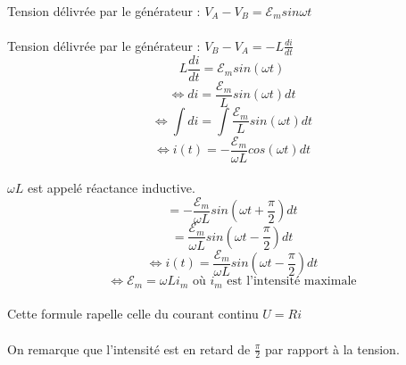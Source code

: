 \documentclass[a4paper]{article}
\begin{document}
\paragraph{} Tension délivrée par le générateur : $V_A-V_B=\mathscr{E}_msin{\omega t}$
\paragraph{} Tension délivrée par le générateur : $V_B-V_A=-L\frac{di}{dt}$
\[L\frac{di}{dt}=\mathscr{E}_msin(\omega t)\]
\[\Leftrightarrow di=\frac{\mathscr{E}_m}{L}sin(\omega t)dt\]
\[\Leftrightarrow \int di=\int \frac{\mathscr{E}_m}{L}sin(\omega t)dt\]
\[\Leftrightarrow i(t)=-\frac{\mathscr{E}_m}{\omega L}cos(\omega t)dt\]
\paragraph {} $\omega L$ est appelé réactance inductive.
\[=-\frac{\mathscr{E}_m}{\omega L}sin\left(\omega t+ \frac{\pi}{2}\right)dt\]
\[=\frac{\mathscr{E}_m}{\omega L}sin\left(\omega t- \frac{\pi}{2}\right)dt\]
\[\Leftrightarrow i(t)=\frac{\mathscr{E}_m}{\omega L}sin\left(\omega t- \frac{\pi}{2}\right)dt\]
\[\Leftrightarrow \mathscr{E}_m=\omega Li_m \text{ où $i_m$ est l'intensité maximale}\]
\paragraph{}Cette formule rapelle celle du courant continu $U=Ri$
\paragraph{}On remarque que l'intensité est en retard de $\frac{\pi}{2}$ par rapport à la tension.
\end{document}
